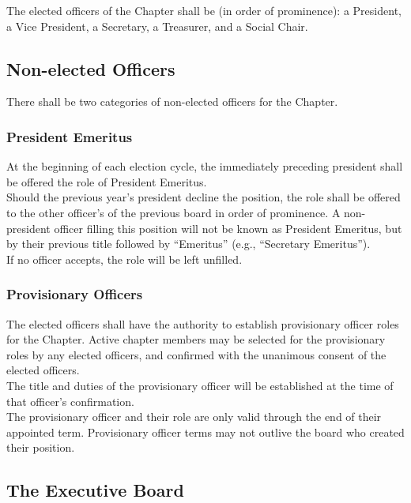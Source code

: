 \documentclass{article}
\begin{document}
The elected officers of the Chapter shall be (in order of prominence): a President, a Vice President, a Secretary, a Treasurer, and a Social Chair.

\subsection{Non-elected Officers}

There shall be two categories of non-elected officers for the Chapter.

\subsubsection{President Emeritus}

At the beginning of each election cycle, the immediately preceding
president shall be offered the role of President Emeritus.\\

Should the previous year's president decline the position, the role
shall be offered to the other officer's of the previous board in order
of prominence. A non-president officer filling this position will not be known as President Emeritus, but by their previous title followed by
``Emeritus'' (e.g., ``Secretary Emeritus'').\\

If no officer accepts, the role will be left unfilled.

\subsubsection{Provisionary Officers}

The elected officers shall have the authority to establish provisionary
officer roles for the Chapter. Active chapter members may be selected
for the provisionary roles by any elected officers, and confirmed with
the unanimous consent of the elected officers.\\

The title and duties of the provisionary officer will be established at
the time of that officer's confirmation.\\

The provisionary officer and their role are only valid through the end
of their appointed term. Provisionary officer terms may not outlive the
board who created their position.

\subsection{The Executive Board}
\end{document}
